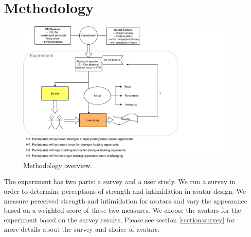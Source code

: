 
\section{Methodology}
\label{section:methodology}

\begin{figure}[H]
  \hspace{-20mm}
    \includegraphics[scale=1]{Files/diagram.pdf}
    \caption{Methodology overview.}
     \label{fig:SurveyRatedMmalesAll}
    \end{figure}

\clearpage
The experiment has two parts: a survey and a user study. We run a survey in order to determine perceptions of strength and intimidation in avatar design. We measure perceived strength and intimidation for avatars and vary the appearance based on a weighted score of these two measures. We choose the avatars for the experiment based on the survey results. Please see section \ref{section:survey} for more details about the survey and choice of avatars.
